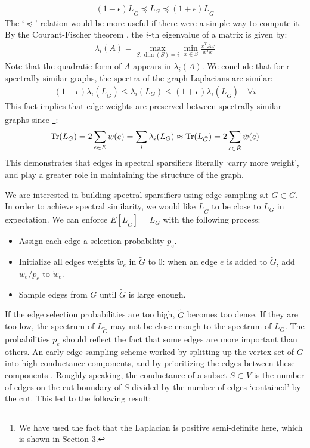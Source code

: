\documentclass{article}
\begin{document}
\begin{align*}
    (1 - \epsilon)L_{\tilde{G}} \preceq L_G \preceq (1 +
    \epsilon)L_{\tilde{G}}
\end{align*}
The `$\preceq$' relation would be more useful if there were a simple way to
compute it. By the Courant-Fischer theorem \cite{CourantFischer}, the $i$-th
eigenvalue of a matrix is given by:
\begin{align*}
    \lambda_i(A) = \max_{S: \dim(S) = i} \min_{x \in S} \frac{x^TAx}{x^Tx}
\end{align*}
Note that the quadratic form of $A$ appears in $\lambda_i(A)$. We conclude
that for $\epsilon$-spectrally similar graphs, the spectra of the graph
Laplacians are similar:
\begin{align*}
    (1 - \epsilon)\lambda_i(L_{\tilde{G}}) \leq \lambda_i(L_G) \leq (1 +
    \epsilon)\lambda_i(L_{\tilde{G}}) \quad \forall{i}
\end{align*}
This fact implies that edge weights are preserved between spectrally similar
graphs since \footnote{We have used the fact that the Laplacian is positive
semi-definite here, which is shown in Section 3.}:
\begin{align*}
    \text{Tr}(L_G) = 2\sum_{e \in E} w(e) = \sum_i \lambda_i(L_G) \approx
    \text{Tr}(L_{\tilde{G}}) = 2\sum_{e \in \tilde{E}} \tilde{w}(e)
\end{align*}
This demonstrates that edges in spectral sparsifiers literally `carry more
weight', and play a greater role in maintaining the structure of the graph.

We are interested in building spectral sparsifiers using edge-sampling s.t
$\tilde{G} \subset G$. In order to achieve spectral similarity, we would
like $L_{\tilde{G}}$ to be close to $L_G$ in expectation. We can enforce
$E[L_{\tilde{G}}] = L_G$ with the following process:
\begin{itemize}
    \item Assign each edge a selection probability $p_e$.
    \item Initialize all edges weights $\tilde{w}_e$ in $\tilde{G}$ to 0:
        when an edge $e$ is added to $\tilde{G}$, add $w_e/p_e$ to
        $\tilde{w}_e$.
    \item Sample edges from $G$ until $\tilde{G}$ is large enough.
\end{itemize}

If the edge selection probabilities are too high, $\tilde{G}$ becomes too
dense. If they are too low, the spectrum of $L_{\tilde{G}}$ may not be close
enough to the spectrum of $L_G$. The probabilities $p_e$ should reflect the
fact that some edges are more important than others. An early edge-sampling
scheme worked by splitting up the vertex set of $G$ into high-conductance
components, and by prioritizing the edges between these components
\cite{SpielmanTeng}. Roughly speaking, the conductance of a subset $S
\subset V$ is the number of edges on the cut boundary of $S$ divided by the
number of edges `contained' by the cut. This led to the following result: \\
\end{document}
